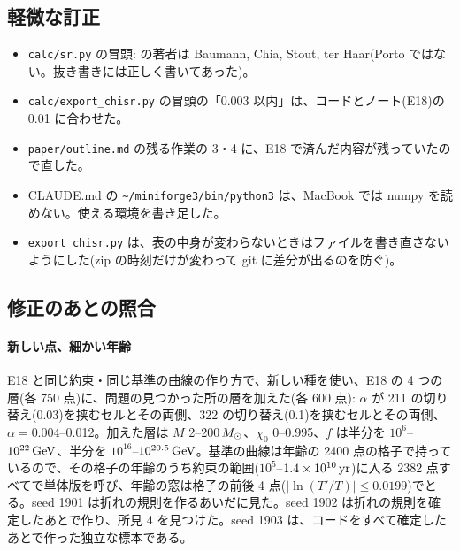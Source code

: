 \subsection{軽微な訂正}

\begin{itemize}
\item \texttt{calc/sr.py} の冒頭:  の著者は Baumann, Chia, Stout, ter Haar(Porto ではない。抜き書きには正しく書いてあった)。
\item \texttt{calc/export\_chisr.py} の冒頭の「0.003 以内」は、コードとノート(E18)の 0.01 に合わせた。
\item \texttt{paper/outline.md} の残る作業の 3・4 に、E18 で済んだ内容が残っていたので直した。
\item CLAUDE.md の \texttt{\textasciitilde/miniforge3/bin/python3} は、MacBook では numpy を読めない。使える環境を書き足した。
\item \texttt{export\_chisr.py} は、表の中身が変わらないときはファイルを書き直さないようにした(zip の時刻だけが変わって git に差分が出るのを防ぐ)。
\end{itemize}

\subsection{修正のあとの照合}

\paragraph{新しい点、細かい年齢}
E18 と同じ約束・同じ基準の曲線の作り方で、新しい種を使い、E18 の 4 つの層(各 750 点)に、問題の見つかった所の層を加えた(各 600 点): $\alpha$ が 211 の切り替え(0.03)を挟むセルとその両側、322 の切り替え(0.1)を挟むセルとその両側、$\alpha=0.004$--0.012。加えた層は $M$ 2--200$\,M_\odot$、$\chi_0$ 0--0.995、$f$ は半分を $10^6$--$10^{22}\,\mathrm{GeV}$、半分を $10^{16}$--$10^{20.5}\,\mathrm{GeV}$。基準の曲線は年齢の 2400 点の格子で持っているので、その格子の年齢のうち約束の範囲($10^5$--$1.4\times10^{10}\,\mathrm{yr}$)に入る 2382 点すべてで単体版を呼び、年齢の窓は格子の前後 4 点($|\ln(T'/T)|\le0.0199$)でとる。seed 1901 は折れの規則を作るあいだに見た。seed 1902 は折れの規則を確定したあとで作り、所見 4 を見つけた。seed 1903 は、コードをすべて確定したあとで作った独立な標本である。


